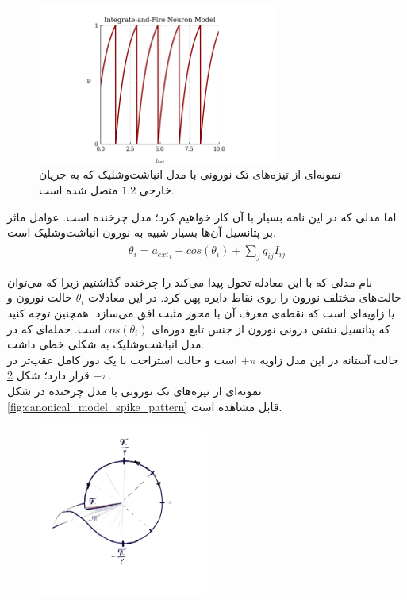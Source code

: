 \begin{figure}
	\centering
	\includegraphics[width=0.7\textwidth]{Figures/IF_model_spike_pattern.png}
	\caption{
		نمونه‌ای از تیزه‌های تک نورونی با مدل انباشت‌وشلیک که به جریان خارجی
	$1.2$
		 متصل شده است.
	}
	\label{fig:IF_model_spike_pattern}
\end{figure}

اما مدلی که در این نامه بسیار با آن کار خواهیم کرد؛ مدل چرخنده است. عوامل ماثر بر پتانسیل آن‌ها بسیار شبیه به نورون انباشت‌وشلیک است.
\begin{align}
	\dot{\theta}_i = {a_{ext}}_i - cos(\theta_i) + \sum_j g_{ij} I_{ij}
\end{align}

نام مدلی که با این معادله تحول پیدا می‌کند را چرخنده گذاشتیم زیرا که می‌توان حالت‌های مختلف نورون را روی نقاط دایره پهن کرد. در این معادلات 
$\theta_i$
حالت نورون و یا زاویه‌ای است که نقطه‌ی معرف آن با محور مثبت افق می‌سازد. همچنین توجه کنید که پتانسیل نشتی درونی نورون از جنس تابع دوره‌ای
$cos(\theta_i)$
است. جمله‌ای که در مدل انباشت‌وشلیک به شکلی خطی داشت.\\
حالت آستانه‌ در این مدل زاویه
$+\pi$
است و حالت استراحت با یک دور کامل عقب‌تر در
$-\pi$
قرار دارد؛ شکل
\ref{fig:rotational_picture}.\\
نمونه‌ای از تیزه‌های تک نورونی با مدل چرخنده در شکل 
\ref{fig:canonical_model_spike_pattern}
قابل مشاهده است.


\begin{figure}
	\centering
	\includegraphics[width=0.5\textwidth]{../Figures/Canonical model.png}
	\caption{}
	\label{fig:rotational_picture}
\end{figure}

